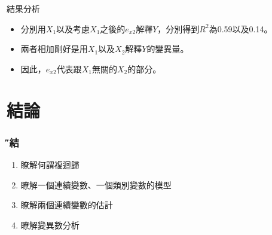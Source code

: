 \documentclass[xcolor=dvipsnames]{beamer}
\begin{document}
\begin{frame}{結果分析}
\begin{itemize}
\item 分別用$X_{1}$以及考慮$X_{1}$之後的$e_{x2}$解釋$Y$，分別得到$R^2$為0.59以及0.14。
\item 兩者相加剛好是用$X_{1}$以及$X_{2}$解釋$Y$的變異量。
\item 因此，$e_{x2}$代表跟$X_{1}$無關的$X_{2}$的部分。
\end{itemize}
\end{frame}
\section{結論}
\begin{frame}\frametitle{\H 總結}
\begin{enumerate}
\item {\K 瞭解何謂複迴歸}
\item {\K 瞭解一個連續變數、一個類別變數的模型}
\item {\K 瞭解兩個連續變數的估計}
\item {\K 瞭解變異數分析}
\end{enumerate}
\end{frame}
\end{document}
